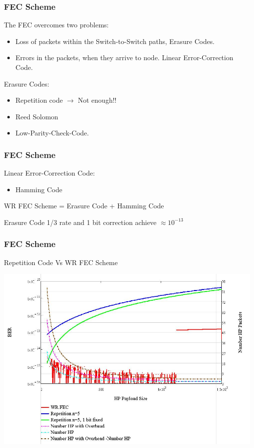 \documentclass[]{beamer}
\begin{document}
\begin{frame}
\frametitle{FEC Scheme}
The FEC overcomes two problems:
\begin{itemize}
	\item Loss of packets within the Switch-to-Switch paths, Erasure Codes.
	\item Errors in the packets, when they arrive to node. Linear Error-Correction Code.
\end{itemize}


Erasure Codes: 
\begin{itemize}
	\item Repetition code $\rightarrow$ Not enough!! 
	\item Reed Solomon 
	\item Low-Parity-Check-Code.
\end{itemize}
\end{frame}

\begin{frame}
\frametitle{FEC Scheme}
Linear Error-Correction Code:
\begin{itemize}
	\item Hamming Code
\end{itemize}

\vspace{0.5cm}
\begin{center}
WR FEC Scheme = Erasure Code + Hamming Code

Erasure Code  1/3 rate and 1 bit correction achieve $\approx 10^{-13}$   

\end{center}
\end{frame}




\begin{frame}
\frametitle{FEC Scheme}
Repetition Code Vs WR FEC Scheme
\begin{center}

  \includegraphics[scale=0.35]{../../figures/robustness/biterror}



\end{center}
\end{frame}
\end{document}
